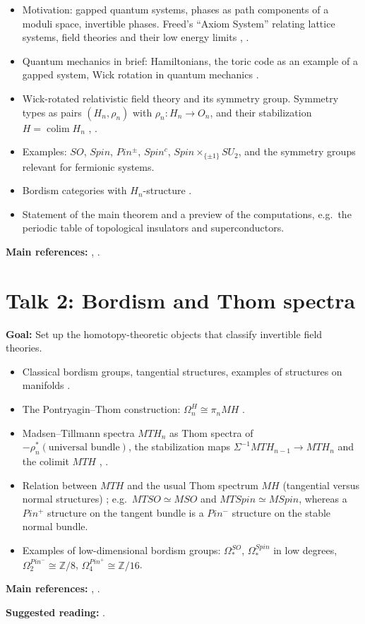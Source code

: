 \documentclass[11pt,a4paper]{article}
\newcommand{\MT}{\mathit{MT}}
\newcommand{\talk}[2]{\section*{Talk #1: #2}}
\newcommand{\refs}[1]{\par\smallskip\textbf{Main references:} #1}
\newcommand{\suggested}[1]{\par\textbf{Suggested reading:} #1}
\begin{document}
\begin{itemize}
  \item Motivation: gapped quantum systems, phases as path components of a moduli space, invertible phases. Freed's ``Axiom System'' relating lattice systems, field theories and their low energy limits \cite[Introduction]{F}, \cite[\S1]{FH}.
  \item Quantum mechanics in brief: Hamiltonians, the toric code as an example of a gapped system, Wick rotation in quantum mechanics \cite[L2.3, L2.5]{F}.
  \item Wick-rotated relativistic field theory and its symmetry group. Symmetry types as pairs $(H_n, \rho_n)$ with $\rho_n\colon H_n \to O_n$, and their stabilization $H = \operatorname{colim} H_n$ \cite[L3.4, L3.6]{F}, \cite[\S2.1]{FH}.
  \item Examples: $SO$, $Spin$, $Pin^\pm$, $Spin^c$, $Spin \times_{\{\pm1\}} SU_2$, and the symmetry groups relevant for fermionic systems.
  \item Bordism categories with $H_n$-structure \cite[\S2.2]{FH}.
  \item Statement of the main theorem \cite[\S1]{FH} and a preview of the computations, e.g.\ the periodic table of topological insulators and superconductors.
\end{itemize}
\refs{\cite[Introduction, L2, L3]{F}, \cite[\S\S1--2]{FH}.}

\talk{2}{Bordism and Thom spectra}

\textbf{Goal:} Set up the homotopy-theoretic objects that classify invertible field theories.

\begin{itemize}
  \item Classical bordism groups, tangential structures, examples of structures on manifolds \cite[L1.1, L1.3]{F}.
  \item The Pontryagin--Thom construction: $\Omega^H_n \cong \pi_n MH$ \cite[L1.5]{F}.
  \item Madsen--Tillmann spectra $\MT H_n$ as Thom spectra of $-\rho_n^*(\text{universal bundle})$, the stabilization maps $\Sigma^{-1}\MT H_{n-1} \to \MT H_n$ and the colimit $\MT H$ \cite[L6.6]{F}, \cite[\S7.1]{FH}.
  \item Relation between $\MT H$ and the usual Thom spectrum $MH$ (tangential versus normal structures) \cite[\S7.1]{FH}; e.g.\ $\MT SO \simeq MSO$ and $\MT Spin \simeq MSpin$, whereas a $Pin^+$ structure on the tangent bundle is a $Pin^-$ structure on the stable normal bundle.
  \item Examples of low-dimensional bordism groups: $\Omega^{SO}_*$, $\Omega^{Spin}_*$ in low degrees, $\Omega^{Pin^-}_2 \cong \mathbb{Z}/8$, $\Omega^{Pin^+}_4 \cong \mathbb{Z}/16$.
\end{itemize}
\refs{\cite[L1, L6.6]{F}, \cite[\S7.1]{FH}.}
\suggested{\cite{GMTW}.}
\end{document}
